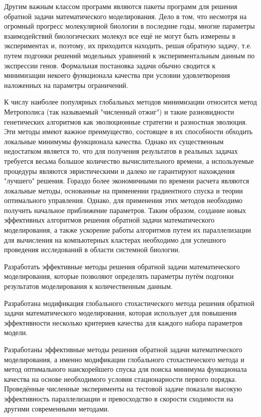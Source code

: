 Другим важным классом программ являются пакеты программ для решения обратной задачи математического моделирования. Дело в том, что несмотря на огромный прогресс молекулярной биологии в последние годы, многие параметры взаимодействий биологических молекул все ещё не могут быть измерены в экспериментах и, поэтому, их приходится находить, решая обратную задачу, т.е. путем подгонки решений модельных уравнений к экспериментальным данным по экспрессии генов. Формальная постановка задачи обычно сводится к минимизации некоего функционала качества при условии удовлетворения наложенных на параметры ограничений.

К числу наиболее популярных глобальных методов минимизации относится метод Метрополиса (так называемый "численный отжиг") и такие разновидности генетических алгоритмов как эволюционные стратегии и разностная эволюция. Эти методы имеют важное преимущество, состоящее в их способности обходить локальные минимумы функционала качества. Однако их существенным недостатком является то, что для получения результатов в реальных задачах требуется весьма большое количество вычислительного времени, а используемые процедуры являются эвристическими и далеко не гарантируют нахождения "лучшего" решения. Гораздо более экономичными по времени расчета являются локальные методы, основанные на применении градиентного спуска и теории оптимального управления. Однако, для применения этих методов необходимо получить начальное приближение параметров. Таким образом, создание новых эффективных алгоритмов решения обратной задачи математического моделирования, а также ускорение работы алгоритмов путем их параллелизации для вычисления на компьютерных кластерах необходимо для успешного проведения исследований в области системной биологии.

Разработать эффективные методы решения обратной задачи математического моделирования, которые позволяют определять параметры путём подгонки результатов моделирования к количественным данным.

Разработана модификация глобального стохастического метода решения обратной задачи математического моделирования, которая использует для повышения эффективности несколько критериев качества для каждого набора параметров модели.

Разработаны эффективные методы решения обратной задачи математического моделирования, а именно модификации глобального стохастического метода и метод оптимального наискорейшего спуска для поиска минимума функционала качества на основе необходимого условия стационарности первого порядка. Проведённые численные эксперименты на тестовой задаче показали высокую эффективность параллелизации и превосходство в скорости сходимости на другими современными методами.


